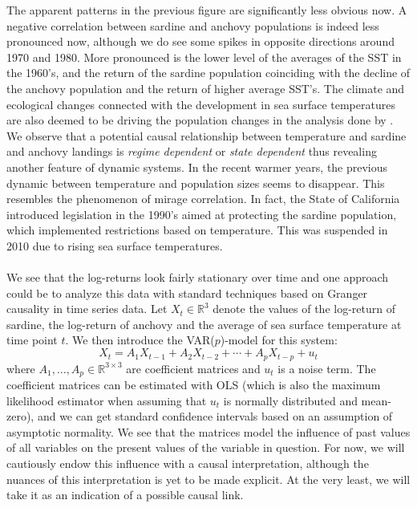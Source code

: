 \documentclass[11pt, a4paper]{memoir}
\theoremstyle{break}
\theoremstyle{break}
\theoremstyle{nonumberplain}
\newcommand{\mR}{\mathbb{R}}
\begin{document}
The apparent patterns in the previous figure are significantly less obvious now. A negative correlation between sardine and anchovy populations is indeed less pronounced now, although we do see some spikes in opposite directions around 1970 and 1980. More pronounced is the lower level of the averages of the SST in the 1960's, and the return of the sardine population coinciding with the decline of the anchovy population and the return of higher average SST's. The climate and ecological changes connected with the development in sea surface temperatures are also deemed to be driving the population changes in the analysis done by \cite{Sardine}. We observe that a potential causal relationship between temperature and sardine and anchovy landings is \textit{regime dependent} or \textit{state dependent} thus revealing another feature of dynamic systems. In the recent warmer years, the previous dynamic between temperature and population sizes seems to disappear. This resembles the phenomenon of mirage correlation. In fact, the State of California introduced legislation in the 1990's aimed at protecting the sardine population, which implemented restrictions based on temperature. This was suspended in 2010 due to rising sea surface temperatures.\\\\
We see that the log-returns look fairly stationary over time and one approach could be to analyze this data with standard techniques based on Granger causality in time series data. Let $X_t\in \mR^3$ denote the values of the log-return of sardine, the log-return of anchovy and the average of sea surface temperature at time point $t$. We then introduce the VAR($p$)-model for this system:
$$X_t=A_1 X_{t-1}+A_2 X_{t-2}+\cdots + A_p X_{t-p}+u_t$$
where $A_1,\ldots, A_p\in \mR^{3\times 3}$ are coefficient matrices and $u_t$ is a noise term. The coefficient matrices can be estimated with OLS (which is also the maximum likelihood estimator when assuming that $u_t$ is normally distributed and mean-zero), and we can get standard confidence intervals based on an assumption of asymptotic normality. We see that the matrices model the influence of past values of all variables on the present values of the variable in question. For now, we will cautiously endow this influence with a causal interpretation, although the nuances of this interpretation is yet to be made explicit. At the very least, we will take it as an indication of a possible causal link.\\\\ 
\end{document}
